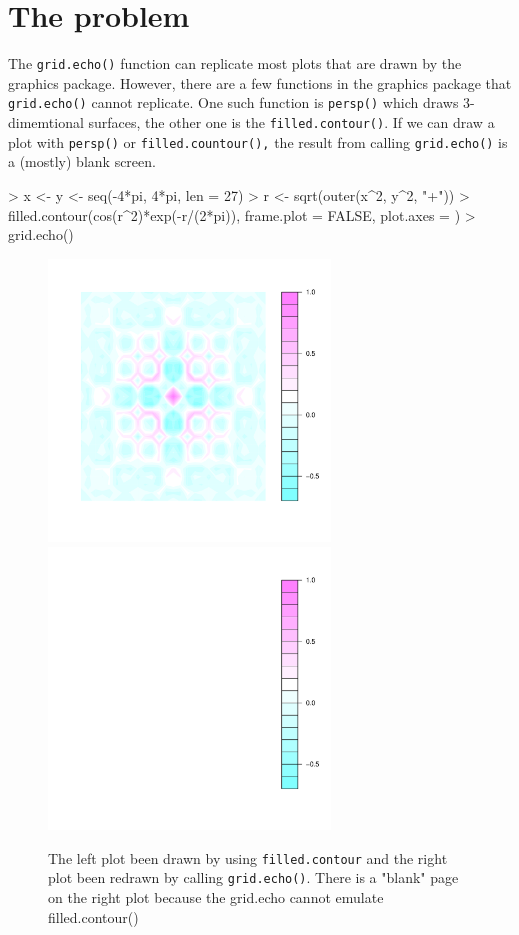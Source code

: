 \documentclass[paper=a4, fontsize=11pt]{report}
\begin{document}
\section{The problem}
The \texttt{grid.echo()} function can replicate most plots that are drawn by the graphics package. However, there are a few functions in the graphics package that \texttt{grid.echo()} cannot replicate. One such function is \texttt{persp()} which draws 3-dimemtional surfaces, the other one is the \texttt{filled.contour()}. If we can draw a plot with \texttt{persp()} or \texttt{filled.countour(),} the result from calling \texttt{grid.echo()} is a (mostly) blank screen. 
\begin{Schunk}
\begin{Sinput}
> x <- y <- seq(-4*pi, 4*pi, len = 27)
> r <- sqrt(outer(x^2, y^2, "+"))
> filled.contour(cos(r^2)*exp(-r/(2*pi)), frame.plot = FALSE, plot.axes = {})
> grid.echo()
\end{Sinput}
\end{Schunk}
\begin{figure}[h]
\begin{center}
  \includegraphics[height = 7.5cm, width = 7.5cm]{figure/report_fill_1}
  \includegraphics[height = 7.5cm, width = 7.5cm]{figure/report_fill_2}
  \caption{The left plot been drawn by using \texttt{filled.contour} and the right plot been redrawn by calling \texttt{grid.echo()}. There is a "blank" page on the right plot because the grid.echo cannot emulate filled.contour()}
  	\label{figure4}
\end{center}
\end{figure}
\end{document}
